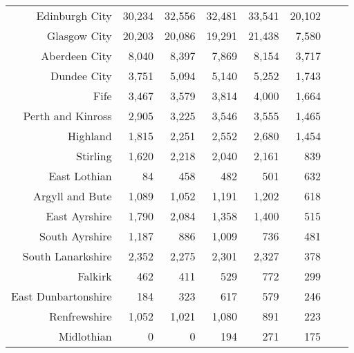 \documentclass[
  12pt,
]{article}
\begin{document}
\begin{longtable}[t]{rrrrrrrr}
\endfoot
\bottomrule
\endlastfoot
Edinburgh City & 30,234 & 32,556 & 32,481 & 33,541 & 20,102 & \cellcolor{white}{ -40.1\%} & \cellcolor{white}{  -9.7\%}\\
Glasgow City & 20,203 & 20,086 & 19,291 & 21,438 & 7,580 & \cellcolor{white}{ -64.6\%} & \cellcolor{white}{ -21.7\%}\\
Aberdeen City & 8,040 & 8,397 & 7,869 & 8,154 & 3,717 & \cellcolor{white}{ -54.4\%} & \cellcolor{white}{ -17.5\%}\\
Dundee City & 3,751 & 5,094 & 5,140 & 5,252 & 1,743 & \cellcolor{white}{ -66.8\%} & \cellcolor{white}{ -17.4\%}\\
Fife & 3,467 & 3,579 & 3,814 & 4,000 & 1,664 & \cellcolor{white}{ -58.4\%} & \cellcolor{white}{ -16.8\%}\\
Perth and Kinross & 2,905 & 3,225 & 3,546 & 3,555 & 1,465 & \cellcolor{white}{ -58.8\%} & \cellcolor{white}{ -15.7\%}\\
Highland & 1,815 & 2,251 & 2,552 & 2,680 & 1,454 & \cellcolor{white}{ -45.7\%} & \cellcolor{white}{  -5.4\%}\\
Stirling & 1,620 & 2,218 & 2,040 & 2,161 & 839 & \cellcolor{white}{ -61.2\%} & \cellcolor{white}{ -15.2\%}\\
East Lothian & 84 & 458 & 482 & 501 & 632 & \cellcolor{white}{  26.1\%} & \cellcolor{white}{  65.6\%}\\
Argyll and Bute & 1,089 & 1,052 & 1,191 & 1,202 & 618 & \cellcolor{white}{ -48.6\%} & \cellcolor{white}{ -13.2\%}\\
East Ayrshire & 1,790 & 2,084 & 1,358 & 1,400 & 515 & \cellcolor{white}{ -63.2\%} & \cellcolor{white}{ -26.8\%}\\
South Ayrshire & 1,187 & 886 & 1,009 & 736 & 481 & \cellcolor{white}{ -34.6\%} & \cellcolor{white}{ -20.2\%}\\
South Lanarkshire & 2,352 & 2,275 & 2,301 & 2,327 & 378 & \cellcolor{white}{ -83.8\%} & \cellcolor{white}{ -36.7\%}\\
Falkirk & 462 & 411 & 529 & 772 & 299 & \cellcolor{white}{ -61.3\%} & \cellcolor{white}{ -10.3\%}\\
East Dunbartonshire & 184 & 323 & 617 & 579 & 246 & \cellcolor{white}{ -57.5\%} & \cellcolor{white}{   7.5\%}\\
Renfrewshire & 1,052 & 1,021 & 1,080 & 891 & 223 & \cellcolor{white}{ -75.0\%} & \cellcolor{white}{ -32.1\%}\\
Midlothian & 0 & 0 & 194 & 271 & 175 & \cellcolor{white}{ -35.4\%} & \cellcolor{white}{}\\

\end{longtable}
\end{document}
